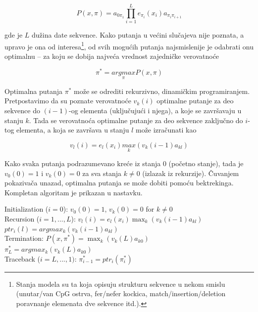 \documentclass[a4paper, 12pt]{article}
\begin{document}
$$P(x, \pi) = a_{0\pi_1}\prod_{i=1}^{L} e_{\pi_i}(x_i) a_{\pi_i\pi_{i+1}}$$ 

\noindent gde je $L$ dužina date sekvence. Kako putanja u većini slučajeva nije poznata, a upravo je ona od interesa\footnote{Stanja modela su ta koja opisuju strukturu sekvence u nekom smislu (unutar/van CpG ostrva, fer/nefer kockica, match/insertion/deletion poravnanje elemenata dve sekvence itd.).}, od svih mogućih putanja najsmislenije je odabrati onu optimalnu -- za koju se dobija najveća vrednost zajedničke verovatnoće 

$$\pi^* = \underset{\pi}{argmax} P(x, \pi)$$

\noindent Optimalna putanja $\pi^*$ može se odrediti rekurzivno, dinamičkim programiranjem. Pretpostavimo da su poznate verovatnoće $v_k(i)$ optimalne putanje za deo sekvence do $(i-1)$-og elementa (uključujući i njega), a koje se završavaju u stanju $k$. Tada se verovatnoća optimalne putanje za deo sekvence zaključno do $i$-tog elementa, a koja se završava u stanju $l$ može izračunati kao

$$v_l(i) = e_l(x_i)\underset{k}{max}(v_k(i-1)a_{kl})$$   

\noindent Kako svaka putanja podrazumevano kreće iz stanja $0$ (početno stanje), tada je $v_0(0) = 1$ i $v_k(0) = 0$ za sva stanja $k \neq 0$ (izlazak iz rekurzije). Čuvanjem pokazivača unazad, optimalna putanja se može dobiti pomoću bektrekinga. Kompletan algoritam je prikazan u nastavku.

\begin{algorithm}[h!] 
 \vspace*{0.2cm}
 Initialization ($i=0$): \hspace{0.3cm} $v_0(0) = 1$, $v_k(0) = 0$ for $k \neq 0$ \\
 \vspace*{0.2cm}
 Recursion ($i=1, ..., L$): \hspace{0.05cm}$v_l(i) = e_l(x_i)\max_k(v_k(i-1)a_{kl})$ \\
 \hspace*{4.25cm} $ptr_i(l) = argmax_k (v_k(i-1)a_{kl})$ \\
 \vspace*{0.2cm}
 Termination: \hspace{1.8cm} $P(x, \pi^*) = \max_k (v_k(L)a_{k0})$ \\
 \hspace*{4.25cm} $\pi_L^* = argmax_k(v_k(L)a_{k0})$ \\
 \vspace*{0.2cm}
 Traceback ($i=L, ..., 1)$: \hspace{0.05cm}$\pi_{i-1}^* = ptr_i(\pi_i^*)$           
\end{algorithm}
\end{document}
